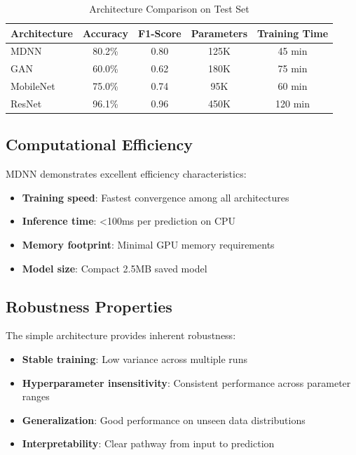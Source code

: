 \documentclass[12pt,a4paper]{article}
\begin{document}
\begin{table}[H]
\centering
\begin{tabular}{lcccc}
\toprule
\textbf{Architecture} & \textbf{Accuracy} & \textbf{F1-Score} & \textbf{Parameters} & \textbf{Training Time} \\
\midrule
MDNN & 80.2\% & 0.80 & 125K & 45 min \\
GAN & 60.0\% & 0.62 & 180K & 75 min \\
MobileNet & 75.0\% & 0.74 & 95K & 60 min \\
ResNet & 96.1\% & 0.96 & 450K & 120 min \\
\bottomrule
\end{tabular}
\caption{Architecture Comparison on Test Set}
\label{tab:architecture-comparison}
\end{table}

\subsection{Computational Efficiency}
MDNN demonstrates excellent efficiency characteristics:

\begin{itemize}
    \item \textbf{Training speed}: Fastest convergence among all architectures
    \item \textbf{Inference time}: <100ms per prediction on CPU
    \item \textbf{Memory footprint}: Minimal GPU memory requirements
    \item \textbf{Model size}: Compact 2.5MB saved model
\end{itemize}

\subsection{Robustness Properties}
The simple architecture provides inherent robustness:

\begin{itemize}
    \item \textbf{Stable training}: Low variance across multiple runs
    \item \textbf{Hyperparameter insensitivity}: Consistent performance across parameter ranges
    \item \textbf{Generalization}: Good performance on unseen data distributions
    \item \textbf{Interpretability}: Clear pathway from input to prediction
\end{itemize}
\end{document}
